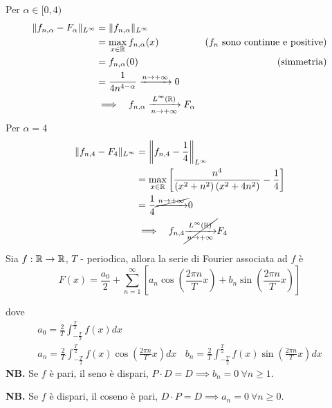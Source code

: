 \begin{enumerate}
Per $\alpha \in [ 0, 4)$
\begin{equation*}
\begin{aligned}
\Vert f_{n, \alpha} - F_{\alpha}\Vert_{L^{\infty}} & = \Vert f_{n, \alpha}\Vert_{L^{\infty}} & \\
 & = \max_{x\in \mathbb{R}} f_{n, \alpha}(x) & \left(f_{n} \ \text{sono continue e positive}\right)\\
 & = f_{n, \alpha}(0) & \text{(simmetria)}\\
 & = \frac{1}{4n^{4 - \alpha}}\xrightarrow{n\rightarrow + \infty} 0 & \\
 & \implies \ \ f_{n, \alpha}\xrightarrow[n\rightarrow + \infty ]{L^{\infty}(\mathbb{R})} F_{\alpha} &
\end{aligned}
\end{equation*}Per $\alpha = 4$
\begin{equation*}
\begin{aligned}
\Vert f_{n, 4} - F_{4}\Vert_{L^{\infty}} & = \left\Vert f_{n, 4} - \frac{1}{4}\right\Vert_{L^{\infty}}\\
 & = \max_{x\in \mathbb{R}}\left[\frac{n^{4}}{\left(x^{2} + n^{2}\right)\left(x^{2} + 4n^{2}\right)} - \frac{1}{4}\right]\\
 & = \frac{1}{4}\cancel{\xrightarrow{n\rightarrow + \infty}} 0\\
 & \implies \ \ f_{n, 4}\cancel{\xrightarrow[n\rightarrow + \infty ]{L^{\infty}(\mathbb{R})}} F_{4}
\end{aligned}
\end{equation*}
\end{enumerate}
\Soluzione
\begin{thm}
Sia $f:\mathbb{R} \rightarrow \mathbb{R} $, $T$ - periodica, allora la serie di Fourier associata ad $f$ è
\begin{equation*}
F(x) = \frac{a_{0}}{2} + \sum\limits^{\infty}_{n = 1}\left[ a_{n}\cos\left(\frac{2\pi n}{T} x\right) + b_{n}\sin\left(\frac{2\pi n}{T} x\right)\right]
\end{equation*}

dove
\begin{gather*}
a_{0} = \frac{2}{T}\int^{\frac{T}{2}}_{- \frac{T}{2}} f(x) dx\\
a_{n} = \frac{2}{T}\int^{\frac{T}{2}}_{- \frac{T}{2}} f(x)\cos\left(\frac{2\pi n}{T} x\right) dx\ \ \ \ b_{n} = \frac{2}{T}\int^{\frac{T}{2}}_{- \frac{T}{2}} f(x)\sin\left(\frac{2\pi n}{T} x\right) dx
\end{gather*}
\textbf{NB.} Se $f$ è pari, il seno è dispari, $P \cdot D = D\implies b_{n} = 0\ \forall n \geq 1$.

\textbf{NB.} Se $f$ è dispari, il coseno è pari, $D \cdot P = D\implies a_{n} = 0\ \forall n \geq 0$.
\end{thm}
